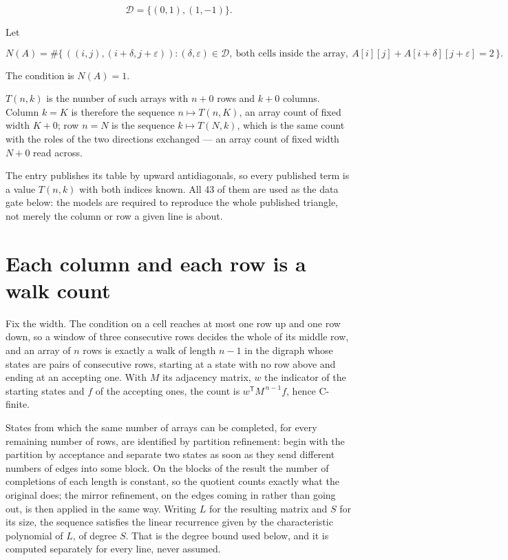 \documentclass[11pt]{article}
\theoremstyle{definition}
\begin{document}
\[\mathcal{D} = \{(0,1), (1,-1)\}.\]

Let

\[N(A) = \#\bigl\{\,((i,j),(i{+}\delta,j{+}\varepsilon)) : (\delta,\varepsilon) \in \mathcal{D},\ \text{both cells inside the array},\ A[i][j] + A[i{+}\delta][j{+}\varepsilon] = 2\,\bigr\}.\]

The condition is $N(A) = 1$.

$T(n,k)$ is the number of such arrays with $n + 0$ rows and $k + 0$ columns. Column $k = K$ is therefore the sequence $n \mapsto T(n,K)$, an array count of fixed width $K + 0$; row $n = N$ is the sequence $k \mapsto T(N,k)$, which is the same count with the roles of the two directions exchanged --- an array count of fixed width $N + 0$ read across.

The entry publishes its table by upward antidiagonals, so every published term is a value $T(n,k)$ with both indices known. All 43 of them are used as the data gate below: the models are required to reproduce the whole published triangle, not merely the column or row a given line is about.

\section{Each column and each row is a walk count}

Fix the width. The condition on a cell reaches at most one row up and one row down, so a window of three consecutive rows decides the whole of its middle row, and an array of $n$ rows is exactly a walk of length $n-1$ in the digraph whose states are pairs of consecutive rows, starting at a state with no row above and ending at an accepting one. With $M$ its adjacency matrix, $w$ the indicator of the starting states and $f$ of the accepting ones, the count is $w^{\mathsf T}M^{\,n-1}f$, hence C-finite.

States from which the same number of arrays can be completed, for every remaining number of rows, are identified by partition refinement: begin with the partition by acceptance and separate two states as soon as they send different numbers of edges into some block. On the blocks of the result the number of completions of each length is constant, so the quotient counts exactly what the original does; the mirror refinement, on the edges coming in rather than going out, is then applied in the same way. Writing $L$ for the resulting matrix and $S$ for its size, the sequence satisfies the linear recurrence given by the characteristic polynomial of $L$, of degree $S$. That is the degree bound used below, and it is computed separately for every line, never assumed.
\end{document}
